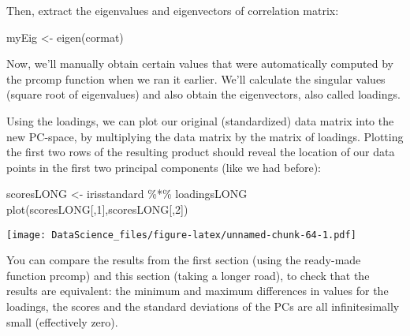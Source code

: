 \documentclass[
]{book}
\newenvironment{Shaded}{\begin{snugshade}}{\end{snugshade}}
\newcommand{\DecValTok}[1]{\textcolor[rgb]{0.00,0.00,0.81}{#1}}
\newcommand{\FunctionTok}[1]{\textcolor[rgb]{0.00,0.00,0.00}{#1}}
\newcommand{\NormalTok}[1]{#1}
\newcommand{\OtherTok}[1]{\textcolor[rgb]{0.56,0.35,0.01}{#1}}
\newcommand{\SpecialCharTok}[1]{\textcolor[rgb]{0.00,0.00,0.00}{#1}}
\begin{document}
Then, extract the eigenvalues and eigenvectors of correlation matrix:

\begin{Shaded}
\begin{Highlighting}[]
\NormalTok{myEig }\OtherTok{\textless{}{-}} \FunctionTok{eigen}\NormalTok{(cormat)}
\end{Highlighting}
\end{Shaded}

Now, we'll manually obtain certain values that were automatically computed by the prcomp function when we ran it earlier. We'll calculate the singular values (square root of eigenvalues) and also obtain the eigenvectors, also called loadings.

\begin{Shaded}
\end{Shaded}

Using the loadings, we can plot our original (standardized) data matrix into the new PC-space, by multiplying the data matrix by the matrix of loadings. Plotting the first two rows of the resulting product should reveal the location of our data points in the first two principal components (like we had before):

\begin{Shaded}
\begin{Highlighting}[]
\NormalTok{scoresLONG }\OtherTok{\textless{}{-}}\NormalTok{ irisstandard }\SpecialCharTok{\%*\%}\NormalTok{ loadingsLONG}
\FunctionTok{plot}\NormalTok{(scoresLONG[,}\DecValTok{1}\NormalTok{],scoresLONG[,}\DecValTok{2}\NormalTok{])}
\end{Highlighting}
\end{Shaded}

\texttt{[image: DataScience\_files/figure-latex/unnamed-chunk-64-1.pdf]}

You can compare the results from the first section (using the ready-made function prcomp) and this section (taking a longer road), to check that the results are equivalent: the minimum and maximum differences in values for the loadings, the scores and the standard deviations of the PCs are all infinitesimally small (effectively zero).
\end{document}
